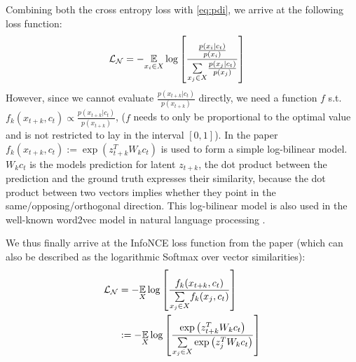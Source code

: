 Combining both the cross entropy loss with \autoref{eq:pdi}, we arrive at the following loss function:
\begin{equation}
	\begin{aligned}
		\mathcal{L_N} &=-\underset{x_i\in X}{\operatorname{\mathbb{E}}}\log\left[\frac{\frac{p(x_i|c_t)}{p(x_i)}}{\underset{x_j\in X}{\sum}\frac{p(x_j|c_t)}{p(x_j)}}\right]
	\end{aligned}
\end{equation}
However, since we cannot evaluate $\frac{p(x_{t+k}|c_t)}{p(x_{t+k})}$ directly, we need a function $f$ s.t. $f_k(x_{t+k}, c_t) \propto \frac{p(x_{t+k}|c_t)}{p(x_{t+k})}$,  ($f$ needs to only be proportional to the optimal value and is not restricted to lay in the interval $[0,1]$). In the paper $f_k(x_{t+k}, c_t) := \exp \left( z_{t+k}^T W_kc_t\right)$ is used to form a simple log-bilinear model. $W_kc_t$ is the models prediction for latent $z_{t+k}$, the dot product between the prediction and the ground truth expresses their similarity, because the dot product between two vectors implies whether they point in the same/opposing/orthogonal direction. This log-bilinear model is also used in the well-known word2vec model in natural language processing \autocite{mikolov2013efficient}.

We thus finally arrive at the InfoNCE loss function from the paper (which can also be described as the logarithmic Softmax over vector similarities): 
\begin{equation}
	\begin{aligned}
		\mathcal{L_N}&=-\underset{X}{\operatorname{\mathbb{E}}}\log\left[\frac{f_k(x_{t+k}, c_t)}{\underset{x_j\in X}{\sum}f_k(x_{j}, c_t)}\right]\\
		&:=-\underset{X}{\operatorname{\mathbb{E}}}\log\left[\frac{\exp \left( z_{t+k}^T W_kc_t\right)}{\underset{x_j\in X}{\sum}\exp \left( z_{j}^T W_kc_t\right)}\right]
	\end{aligned}
\end{equation}

